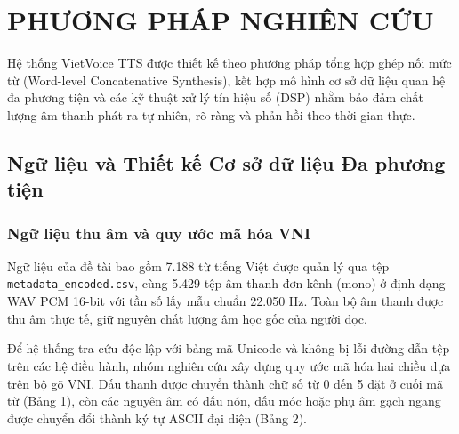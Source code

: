 \section{PHƯƠNG PHÁP NGHIÊN CỨU}

Hệ thống VietVoice TTS được thiết kế theo phương pháp tổng hợp ghép nối mức từ (Word-level Concatenative Synthesis), kết hợp mô hình cơ sở dữ liệu quan hệ đa phương tiện và các kỹ thuật xử lý tín hiệu số (DSP) nhằm bảo đảm chất lượng âm thanh phát ra tự nhiên, rõ ràng và phản hồi theo thời gian thực.

\subsection{Ngữ liệu và Thiết kế Cơ sở dữ liệu Đa phương tiện}

\subsubsection{Ngữ liệu thu âm và quy ước mã hóa VNI}
Ngữ liệu của đề tài bao gồm 7.188 từ tiếng Việt được quản lý qua tệp \texttt{metadata\_encoded.csv}, cùng 5.429 tệp âm thanh đơn kênh (mono) ở định dạng WAV PCM 16-bit với tần số lấy mẫu chuẩn 22.050 Hz. Toàn bộ âm thanh được thu âm thực tế, giữ nguyên chất lượng âm học gốc của người đọc.

Để hệ thống tra cứu độc lập với bảng mã Unicode và không bị lỗi đường dẫn tệp trên các hệ điều hành, nhóm nghiên cứu xây dựng quy ước mã hóa hai chiều dựa trên bộ gõ VNI. Dấu thanh được chuyển thành chữ số từ 0 đến 5 đặt ở cuối mã từ (Bảng 1), còn các nguyên âm có dấu nón, dấu móc hoặc phụ âm gạch ngang được chuyển đổi thành ký tự ASCII đại diện (Bảng 2).

